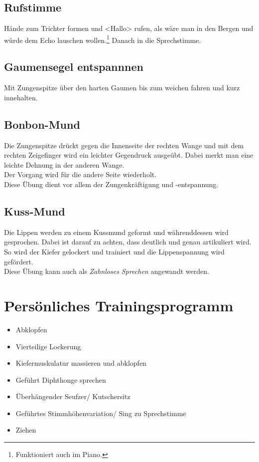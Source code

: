 \documentclass[ngerman, a4paper, twoside]{scrbook}%
\begin{document}
		\section{Rufstimme}
	  Hände zum Trichter formen und <Hallo> rufen, als wäre man in den Bergen und würde dem Echo lauschen wollen.\footnote{Funktioniert auch im Piano.} Danach in die Sprechstimme.

		\section{Gaumensegel entspannnen}
	  Mit Zungenspitze über den harten Gaumen bis zum weichen fahren und kurz innehalten.

		\section{Bonbon-Mund}
		Die Zungenspitze drückt gegen die Innenseite der rechten Wange und mit dem rechten Zeigefinger wird ein leichter Gegendruck ausgeübt. Dabei merkt man eine leichte Dehnung in der anderen Wange.\\
		Der Vorgang wird für die andere Seite wiederholt. \\

		Diese Übung dient vor allem der Zungenkräftigung und -entspannung.

		\section{Kuss-Mund}
		Die Lippen werden zu einem Kussmund geformt und währenddessen wird gesprochen. Dabei ist darauf zu achten, dass deutlich und genau artikuliert wird. So wird der Kiefer gelockert und trainiert und die Lippenspannung wird gefördert.\\
		Diese Übung kann auch als \emph{Zahnloses Sprechen} angewandt werden.





	  \chapter{Persönliches Trainingsprogramm}
	  \begin{itemize}
	  	\item Abklopfen
	  	\item Vierteilige Lockerung
	  	\item Kiefermuskulatur massieren und abklopfen
	  	\item Geführt Diphthonge sprechen
	  	\item Überhängender Seufzer/ Kutschersitz
	  	\item Geführtes Stimmhöhenvariation/ Sing zu Sprechstimme
	  	\item Ziehen
	  \end{itemize}
\end{document}
